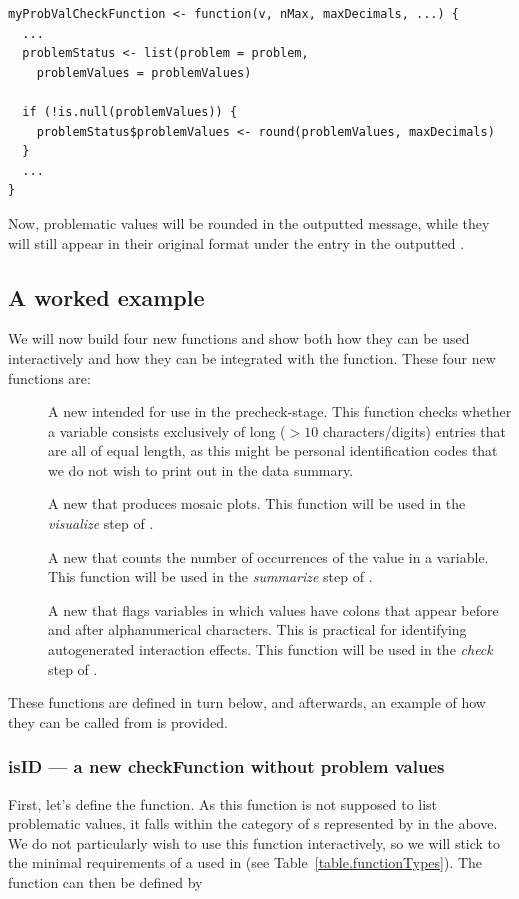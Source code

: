 \documentclass[article,shortnames]{jss}
\begin{document}
\begin{Verbatim}
myProbValCheckFunction <- function(v, nMax, maxDecimals, ...) {
  ...
  problemStatus <- list(problem = problem,
    problemValues = problemValues)

  if (!is.null(problemValues)) {
    problemStatus$problemValues <- round(problemValues, maxDecimals)
  }
  ...
}
\end{Verbatim}

Now, problematic values will be rounded in the outputted message, while they
will still appear in their original format under the entry  %
in the outputted .

\subsection{A worked example}

We will now build four new functions and show both how they can be
used interactively and how they can be integrated with the 
function. These four new functions are:
\begin{description}
\item[] A new  intended for use in the precheck-stage. This function checks whether a variable consists exclusively of long ($> 10$ characters/digits) entries that are all of equal length, as this might be personal identification codes that we do not wish to print out in the data summary.
\item[] A new  that produces mosaic plots. This function will be used in the \textit{visualize} step of .
\item[] A new  that counts the number of occurrences of the value  in a variable. This function will be used in the \textit{summarize} step of .
\item[] A new  that flags variables in which values have colons that appear before and after alphanumerical characters. This is practical for identifying autogenerated interaction effects. This function will be used in the \textit{check} step of .
\end{description}
These functions are defined in turn below, and afterwards, an example of how they can be called from  is provided.

\subsubsection{isID --- a new checkFunction without problem values}
First, let's define the  function. As this function is not
supposed to list problematic values, it falls within
the category of s represented by
 in the above. We do not particularly wish
to use this function interactively, so we will stick to the minimal
requirements of a  used in  (see
Table~\ref{table.functionTypes}). The function can then be defined by
\end{document}
